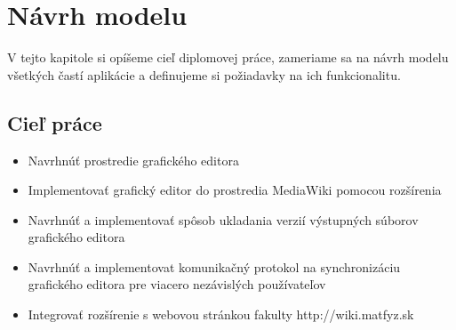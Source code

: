 \chapter{Návrh modelu}\label{chap:proposal}

V tejto kapitole si opíšeme cieľ diplomovej práce, zameriame sa na návrh modelu všetkých častí aplikácie a definujeme si požiadavky na ich funkcionalitu. 

\section{Cieľ práce}
\begin{itemize}
	\item Navrhnúť prostredie grafického editora
	\item Implementovať grafický editor do prostredia MediaWiki pomocou rozšírenia
	\item Navrhnúť a implementovať spôsob ukladania verzií výstupných súborov grafického editora
	\item Navrhnúť a implementovat komunikačný protokol na synchronizáciu grafického editora pre viacero nezávislých používateľov
	\item Integrovať rozšírenie s webovou stránkou fakulty http://wiki.matfyz.sk
\end{itemize}